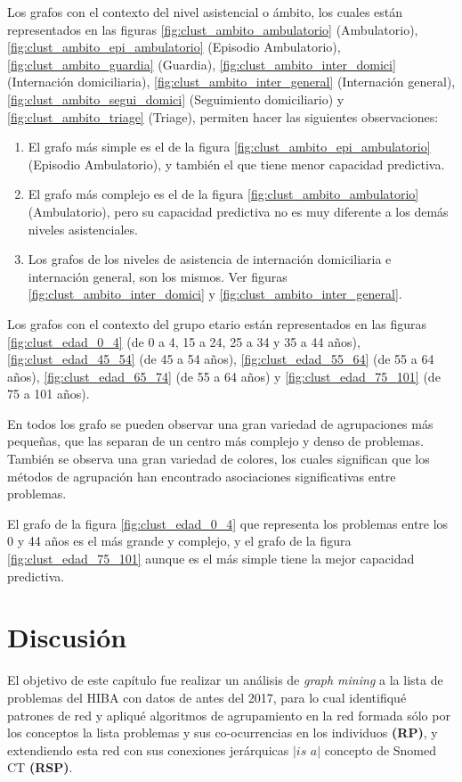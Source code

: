 Los grafos con el contexto del nivel asistencial o ámbito, los cuales están representados en las figuras \ref{fig:clust_ambito_ambulatorio} (Ambulatorio), \ref{fig:clust_ambito_epi_ambulatorio} (Episodio Ambulatorio), \ref{fig:clust_ambito_guardia} (Guardia), \ref{fig:clust_ambito_inter_domici} (Internación domiciliaria), \ref{fig:clust_ambito_inter_general} (Internación general), \ref{fig:clust_ambito_segui_domici} (Seguimiento domiciliario) y \ref{fig:clust_ambito_triage} (Triage), permiten hacer las siguientes observaciones:

\begin{enumerate}
\item El grafo más simple es el de la figura \ref{fig:clust_ambito_epi_ambulatorio} (Episodio Ambulatorio), y también el que tiene menor capacidad predictiva.
\item El grafo más complejo es el de la figura \ref{fig:clust_ambito_ambulatorio} (Ambulatorio), pero su capacidad predictiva no es muy diferente a los demás niveles asistenciales.
\item Los grafos de los niveles de asistencia de internación domiciliaria e internación general, son los mismos. Ver figuras \ref{fig:clust_ambito_inter_domici}  y \ref{fig:clust_ambito_inter_general}.

\end{enumerate}

Los grafos con el contexto del grupo etario están representados en las figuras \ref{fig:clust_edad_0_4} (de 0 a 4, 15 a 24, 25 a 34 y 35 a 44 años), \ref{fig:clust_edad_45_54} (de 45 a 54 años), \ref{fig:clust_edad_55_64} (de 55 a 64 años), \ref{fig:clust_edad_65_74} (de 55 a 64 años) y \ref{fig:clust_edad_75_101} (de 75 a 101 años).

En todos los grafo se pueden observar una gran variedad de agrupaciones más pequeñas, que las separan de un centro más complejo y denso de problemas. También se observa una gran variedad de colores, los cuales significan que los métodos de agrupación han encontrado asociaciones significativas entre problemas.

El grafo de la figura \ref{fig:clust_edad_0_4} que representa los problemas entre los 0 y 44 años es el más grande y complejo, y el grafo de la figura \ref{fig:clust_edad_75_101} aunque es el más simple tiene la mejor capacidad predictiva.

\section{Discusión}
El objetivo de este capítulo fue realizar un análisis de \textit{graph mining} a la lista de problemas del HIBA con datos de antes del 2017, para lo cual identifiqué patrones de red y apliqué algoritmos de agrupamiento en la red formada sólo por los conceptos la lista problemas y sus co-ocurrencias en los individuos \textbf{(RP)}, y extendiendo esta red con sus conexiones jerárquicas $|\textit{is a}|$  concepto de Snomed CT \textbf{(RSP)}.

